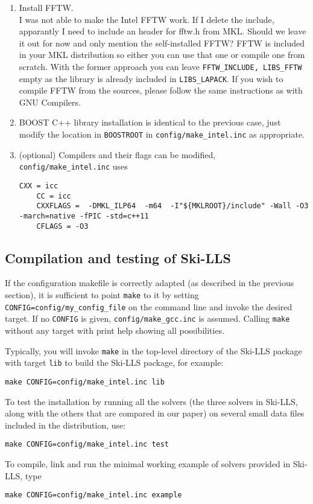 \documentclass[english,11pt]{article}
\begin{document}
\begin{enumerate}
    \item Install FFTW.\\
    {\color{red} I was not able to make the Intel FFTW work. If I delete the include, apparantly I need to include an header for fftw.h from MKL. Should we leave it out for now and only mention the self-installed FFTW? }
    FFTW is included in your MKL distribution so either you can use that one or compile one from scratch. With the former approach you can leave {\tt FFTW_INCLUDE, LIBS_FFTW} empty as the library is already included in {\tt LIBS_LAPACK}. If you wish to compile FFTW from the sources, please follow the same instructions as with GNU Compilers.
    
    \item BOOST C++ library installation is identical to the previous case, just modify the location in {\tt BOOSTROOT} in {\tt config/make_intel.inc} as appropriate.
    
    \item (optional) Compilers and their flags can be modified, {\tt config/make_intel.inc} uses
    \begin{lstlisting}[breaklines=true, showstringspaces=false]
    CXX = icc
    CC = icc
    CXXFLAGS =  -DMKL_ILP64  -m64  -I"${MKLROOT}/include" -Wall -O3 -march=native -fPIC -std=c++11
    CFLAGS = -O3
    \end{lstlisting}
\end{enumerate}

\subsection{Compilation and testing of Ski-LLS}

If the configuration makefile is correctly adapted (as described in the previous section), it is sufficient to point {\tt make} to it by setting {\tt CONFIG=config/my_config_file} on the command line and invoke the desired target. If no {\tt CONFIG} is given, {\tt config/make_gcc.inc} is assumed. Calling {\tt make} without any target with print help showing all possibilities.

Typically, you will invoke {\tt make} in the top-level directory of the Ski-LLS package with target {\tt lib} to build the Ski-LLS package, for example:
\begin{lstlisting}[breaklines=true, showstringspaces=false]
make CONFIG=config/make_intel.inc lib
\end{lstlisting}
To test the installation by running all the solvers (the three solvers in Ski-LLS, along with the others that are compared in our paper) on several small data files included in the distribution, use:
\begin{lstlisting}[breaklines=true, showstringspaces=false]
make CONFIG=config/make_intel.inc test
\end{lstlisting}
To compile, link and run the minimal working example of solvers provided in Ski-LLS, type
\begin{lstlisting}[breaklines=true, showstringspaces=false]
make CONFIG=config/make_intel.inc example
\end{lstlisting}
\end{document}
